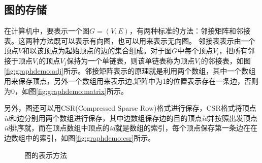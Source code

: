 \subsection{图的存储}
在计算机中，要表示一个图$G=(V,E)$，有两种标准的方法：邻接矩阵和邻接表。这两种方法既可以表示有向图，也可以用来表示无向图。
邻接表表示由一个顶点$V$和以该顶点为起始顶点的边的集合组成。对于图$G$中每个顶点$V$$_i$，把所有邻接于顶点$V$$_i$的顶点$V$$_j$保持为一个单链表，则该单链表称为顶点$V$$_i$的邻接表，如图\ref{fig:graphdemo:adj}所示。邻接矩阵表示的原理就是利用两个数组，其中一个数组用来保存顶点，另外一个数组用来表示边,矩阵中为1的位置表示存在一条边，否则为0，如图\ref{fig:graphdemo:matrix}所示。

另外，图还可以用CSR(Compressed Sparse Row)格式进行保存，CSR格式将顶点\textit{id}和边分别用两个数组进行保存，其中边数组保存边的目的顶点\textit{id}并按照出发顶点\textit{id}排序就，而在顶点数组中顶点的\textit{id}就是数组的索引，每个顶点保存第一条边在在边数组中的索引，如图\ref{fig:graphdemo:csr}所示。
\begin{figure}[htbp]
  \centering
  \caption{图的表示方法}\label{fig:graphdemo}
\vspace{\baselineskip}
\end{figure}

